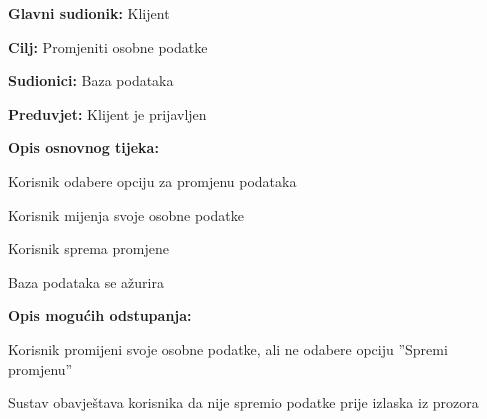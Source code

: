                         \noindent {}
					\begin{packed_item}
	
						\item \textbf{Glavni sudionik: }Klijent
						\item  \textbf{Cilj:} Promjeniti osobne podatke
						\item  \textbf{Sudionici:} Baza podataka
						\item  \textbf{Preduvjet:} Klijent je prijavljen
						\item  \textbf{Opis osnovnog tijeka:}
						
						\item[] \begin{packed_enum}
	
							\item Korisnik odabere opciju za promjenu podataka
							\item Korisnik mijenja svoje osobne podatke
							\item Korisnik sprema promjene
                                \item Baza podataka se ažurira
							
						\end{packed_enum}

                            \item  \textbf{Opis mogućih odstupanja:}
						
						\item[] \begin{packed_item}
	
							\item[2.a] Korisnik promijeni svoje osobne podatke, ali ne odabere opciju ”Spremi promjenu”

							\item[] \begin{packed_enum}
								
								\item Sustav obavještava korisnika da nije spremio podatke prije izlaska iz prozora
								
								
							\end{packed_enum}
	
							
						\end{packed_item}	
					\end{packed_item}

